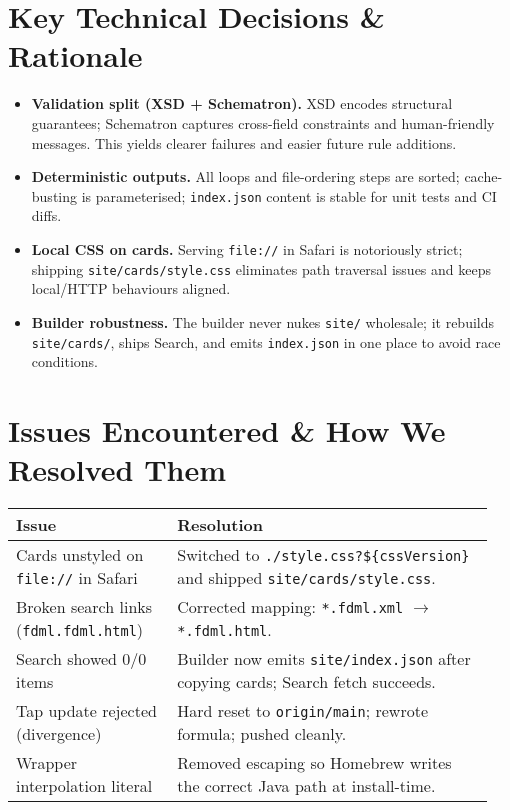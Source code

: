 \documentclass[11pt,a4paper]{article}
\newcommand{\code}[1]{\texttt{#1}}
\newcommand{\smallsec}[1]{\textbf{#1}\quad}
\begin{document}
\section{Key Technical Decisions \& Rationale}
\begin{itemize}[leftmargin=1.2em]
  \item \smallsec{Validation split (XSD + Schematron).} XSD encodes structural guarantees; Schematron captures cross-field constraints and human-friendly messages. This yields clearer failures and easier future rule additions.
  \item \smallsec{Deterministic outputs.} All loops and file-ordering steps are sorted; cache-busting is parameterised; \code{index.json} content is stable for unit tests and CI diffs.
  \item \smallsec{Local CSS on cards.} Serving \code{file://} in Safari is notoriously strict; shipping \code{site/cards/style.css} eliminates path traversal issues and keeps local/HTTP behaviours aligned.
  \item \smallsec{Builder robustness.} The builder never nukes \code{site/} wholesale; it rebuilds \code{site/cards/}, ships Search, and emits \code{index.json} in one place to avoid race conditions.
\end{itemize}

\section{Issues Encountered \& How We Resolved Them}
\begin{longtable}{L{0.32\linewidth} L{0.63\linewidth}}
\textbf{Issue} & \textbf{Resolution}\\\hline
Cards unstyled on \code{file://} in Safari & Switched to \code{./style.css?\$\{cssVersion\}} and shipped \code{site/cards/style.css}.\\
Broken search links (\code{fdml.fdml.html}) & Corrected mapping: \code{*.fdml.xml} $\rightarrow$ \code{*.fdml.html}.\\
Search showed 0/0 items & Builder now emits \code{site/index.json} after copying cards; Search fetch succeeds.\\
Tap update rejected (divergence) & Hard reset to \code{origin/main}; rewrote formula; pushed cleanly.\\
Wrapper interpolation literal & Removed escaping so Homebrew writes the correct Java path at install-time.\\
\end{longtable}
\end{document}
